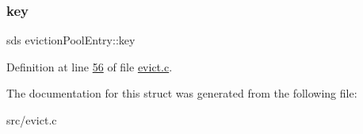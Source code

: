 \mbox{\label{structevictionPoolEntry_ab2dd4d387743e8435f5a50f66ae9c9f1}} 
\subsubsection{\texorpdfstring{key}{key}}
{\footnotesize\ttfamily sds eviction\+Pool\+Entry\+::key}



Definition at line \hyperlink{evict_8c_source_l00056}{56} of file \hyperlink{evict_8c_source}{evict.\+c}.



The documentation for this struct was generated from the following file\+:\begin{DoxyCompactItemize}
\item 
src/evict.\+c\end{DoxyCompactItemize}
